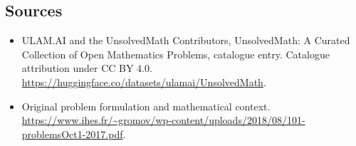 \documentclass[11pt]{article}
\begin{document}
\subsection{Sources}
\begin{itemize}
\item[\hypertarget{source:statement:1}{S1}] ULAM.AI and the UnsolvedMath Contributors, UnsolvedMath: A Curated Collection of Open Mathematics Problems, catalogue entry. Catalogue attribution under CC BY 4.0.
\url{https://huggingface.co/datasets/ulamai/UnsolvedMath}.
\item[\hypertarget{source:statement:2}{S2}] Original problem formulation and mathematical context.
\url{https://www.ihes.fr/~gromov/wp-content/uploads/2018/08/101-problemsOct1-2017.pdf}.
\end{itemize}
\label{end:statement}
\end{document}
